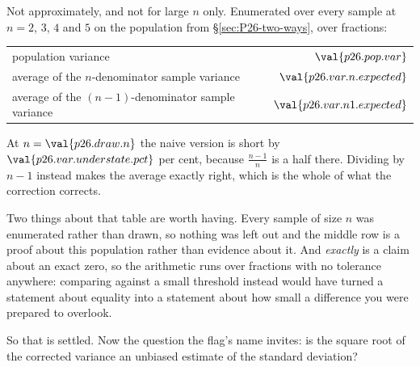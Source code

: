 \begin{fr}

Not approximately, and not for large $n$ only. Enumerated over every sample
at $n = 2$, $3$, $4$ and $5$ on the population from \S\ref{sec:P26-two-ways},
over fractions:

\begin{center}
\begin{tabular}{lr}
\toprule
population variance & $\val{p26.pop.var}$ \\
average of the $n$-denominator sample variance &
  $\val{p26.var.n.expected}$ \\
average of the $(n-1)$-denominator sample variance &
  $\val{p26.var.n1.expected}$ \\
\bottomrule
\end{tabular}
\end{center}

At $n = \val{p26.draw.n}$ the naive version is short by
$\val{p26.var.understate.pct}$ per cent, because $\frac{n-1}{n}$ is a half
there. Dividing by $n-1$ instead makes the average exactly right, which is
the whole of what the correction corrects.

Two things about that table are worth having. Every sample of size $n$ was
enumerated rather than drawn, so nothing was left out and the middle row is
a proof about this population rather than evidence about it. And
\emph{exactly} is a claim about an exact zero, so the arithmetic runs over
fractions with no tolerance anywhere: comparing against a small threshold
instead would have turned a statement about equality into a statement about
how small a difference you were prepared to overlook.

So that is settled. Now the question the flag's name invites: is the square
root of the corrected variance an unbiased estimate of the standard
deviation?
\dotline
\nextframe
\end{fr}

